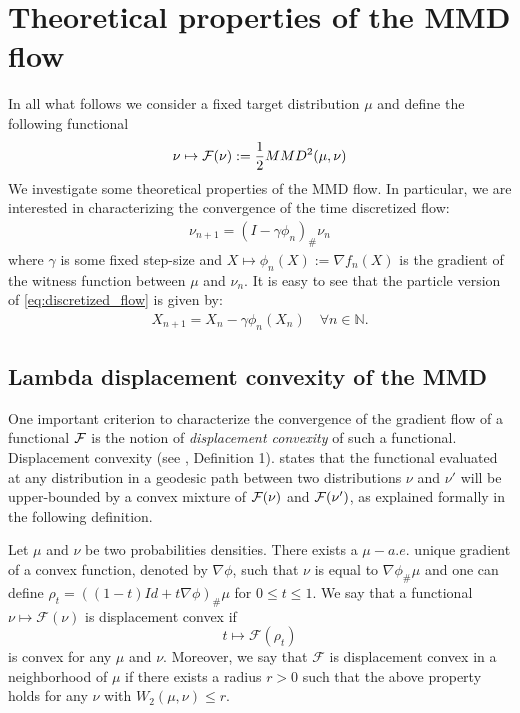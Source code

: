 
\section{Theoretical properties of the MMD flow}


In all what follows we consider a fixed target distribution $\mu$ and define the following functional 
\begin{align}\label{eq:MMD_functional}
	\nu \mapsto {{\mathcal F}}(\nu):=\frac{1}{2} MMD^2(\mu,\nu)\textbf{}
\end{align}
We investigate some theoretical properties of the MMD flow. In particular, we are interested in characterizing the convergence of the time discretized flow:
	\begin{align}\label{eq:discretized_flow}
		\nu_{n+1} = (I -\gamma \phi_n)_{\#}\nu_n
	\end{align}
where $\gamma$ is some fixed step-size and $X \mapsto \phi_n(X):=\nabla f_{n}(X)$ is the gradient of the witness function between $\mu$ and $\nu_n$. It is easy to see that the particle version of \cref{eq:discretized_flow} is given by:
\begin{align}
	X_{n+1} = X_n - \gamma \phi_n(X_n) \quad\forall n\in \mathbb{N}.
\end{align} 

\subsection{Lambda displacement convexity of the MMD}

One important criterion to characterize the convergence of the gradient flow of a functional ${{\mathcal F}}$ is the notion of \textit{displacement convexity} of such a functional. Displacement convexity (see \cite{Villani:2004}, Definition 1). states that the functional evaluated at any distribution in a geodesic path between two distributions $\nu$ and $\nu'$ will be upper-bounded by a convex mixture of ${{\mathcal F}}(\nu)$ and ${{\mathcal F}}(\nu')$, as explained formally in the following definition.
\begin{definition}\label{def:displacement_convexity}
 Let $\mu$
and $\nu$ be two probabilities densities. There exists a $\mu-a.e.$
unique gradient of a convex function, denoted by $\nabla\phi$, such that $\nu$
is equal to $\nabla\phi_{\#}\mu$ and one can define  $\rho_{t}=((1-t)Id+t\nabla\phi)_{\#}\mu$
for $0\leq t\leq1$. We say that a functional $\nu\mapsto\mathcal{F}(\nu)$
is displacement convex if 
\[
t\mapsto\mathcal{F}(\rho_{t})
\]
 is convex for any $\mu$ and $\nu$. Moreover, we say that $\mathcal{F}$
is displacement convex in a neighborhood of $\mu$ if there exists a radius $r>0$
such that the above property holds for any $\nu$ with $W_{2}(\mu,\nu)\leq r$.
\end{definition}


